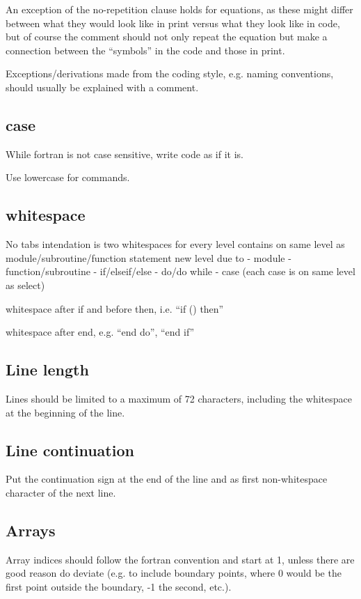 \documentclass{article}
\begin{document}
An exception of the no-repetition clause holds for equations, as these
might differ between what they would look like in print versus what they
look like in code, but of course the comment should not only repeat the
equation but make a connection between the ``symbols'' in the code and
those in print.

Exceptions/derivations made from the coding style, e.g. naming
conventions, should usually be explained with a comment.

\subsection{case}
While fortran is not case sensitive, write code as if it is.

Use lowercase for commands.

\subsection{whitespace}
No tabs
intendation is two whitespaces for every level
contains on same level as module/subroutine/function statement
new level due to
- module
- function/subroutine
- if/elseif/else
- do/do while
- case (each case is on same level as select)

whitespace after if and before then, i.e. ``if () then''

whitespace after end, e.g. ``end do'', ``end if''

\subsection{Line length}
Lines should be limited to a maximum of 72 characters, including the
whitespace at the beginning of the line.

\subsection{Line continuation}
Put the continuation sign at the end of the line and as first
non-whitespace character of the next line.

\subsection{Arrays}
Array indices should follow the fortran convention and start at 1,
unless there are good reason do deviate (e.g. to include boundary
points, where 0 would be the first point outside the boundary, -1 the
second, etc.).
\end{document}
